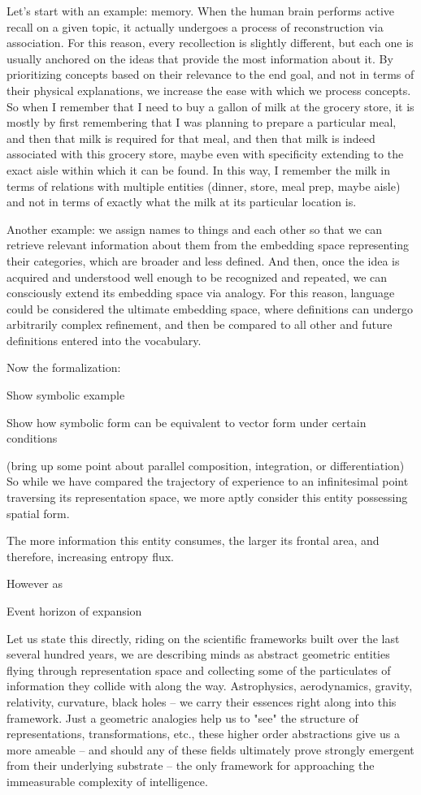 Let's start with an example: memory. When the human brain performs active recall on a given topic, it actually undergoes a process of reconstruction via association. For this reason, every recollection is slightly different, but each one is usually anchored on the ideas that provide the most information about it. By prioritizing concepts based on their relevance to the end goal, and not in terms of their physical explanations, we increase the ease with which we process concepts. So when I remember that I need to buy a gallon of milk at the grocery store, it is mostly by first remembering that I was planning to prepare a particular meal, and then that milk is required for that meal, and then that milk is indeed associated with this grocery store, maybe even with specificity extending to the exact aisle within which it can be found. In this way, I remember the milk in terms of relations with multiple entities (dinner, store, meal prep, maybe aisle) and not in terms of exactly what the milk at its particular location is.

Another example: we assign names to things and each other so that we can retrieve relevant information about them from the embedding space representing their categories, which are broader and less defined. And then, once the idea is acquired and understood well enough to be recognized and repeated, we can consciously extend its embedding space via analogy. For this reason, language could be considered the ultimate embedding space, where definitions can undergo arbitrarily complex refinement, and then be compared to all other and future definitions entered into the vocabulary.

Now the formalization:

Show symbolic example

Show how symbolic form can be equivalent to vector form under certain conditions

(bring up some point about parallel composition, integration, or differentiation) So while we have compared the trajectory of experience to an infinitesimal point traversing its representation space, we more aptly consider this entity possessing spatial form.

The more information this entity consumes, the larger its frontal area, and therefore, increasing entropy flux.

However as

Event horizon of expansion

Let us state this directly, riding on the scientific frameworks built over the last several hundred years, we are describing minds as abstract geometric entities flying through representation space and collecting some of the particulates of information they collide with along the way. Astrophysics, aerodynamics, gravity, relativity, curvature, black holes -- we carry their essences right along into this framework. Just a geometric analogies help us to "see" the structure of representations, transformations, etc., these higher order abstractions give us a more ameable -- and should any of these fields ultimately prove strongly emergent from their underlying substrate -- the only framework for approaching the immeasurable complexity of intelligence.

